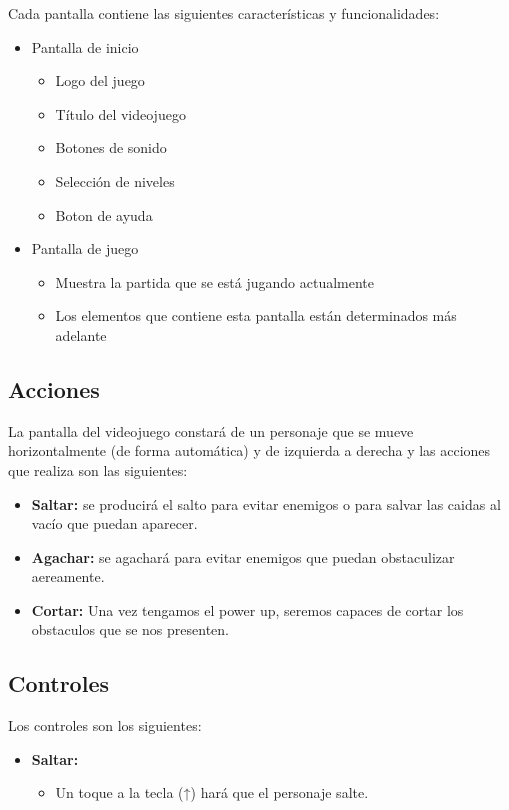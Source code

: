 \documentclass[palatino]{apuntes}
\begin{document}
Cada pantalla contiene las siguientes características y funcionalidades:
\begin{itemize}
    \item Pantalla de inicio
        \begin{itemize}
            \item Logo del juego
            \item Título del videojuego
 	    \item Botones de sonido
	    \item Selección de niveles
	    \item Boton de ayuda
        \end{itemize}
   
    \item Pantalla de juego
        \begin{itemize}
            \item Muestra la partida que se está jugando actualmente
            \item Los elementos que contiene esta pantalla están determinados más adelante
        \end{itemize}
    
\end{itemize}


\subsection{Acciones}
La pantalla del videojuego constará de un personaje que se mueve horizontalmente (de forma automática) y de izquierda a derecha y las acciones que  realiza son las siguientes:

\begin{itemize}
    \item \textbf{Saltar:} se producirá el salto para evitar enemigos o para salvar las caidas al vacío que puedan aparecer.
    \item \textbf{Agachar:} se agachará para evitar enemigos que puedan obstaculizar aereamente.
    \item \textbf{Cortar:} Una vez tengamos el power up, seremos capaces de cortar los obstaculos que se nos presenten.
\end{itemize}


\subsection{Controles}
Los controles son los siguientes:

\begin{itemize}
    \item \textbf{Saltar:}
        \begin{itemize}
            \item Un toque a la tecla (↑) hará que el personaje salte.
        \end{itemize}
    
\end{itemize}
\end{document}
